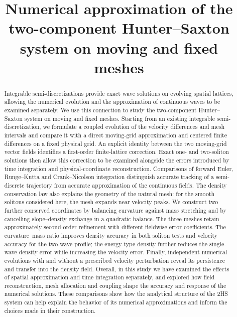 \documentclass{article}
\begin{document}
\title{\bfseries Numerical approximation of the two-component Hunter–Saxton system on moving and fixed meshes}
\author{}
\date{}
\maketitle
\begin{abstract}
Integrable semi-discretizations provide exact wave solutions on evolving spatial lattices, allowing the numerical evolution and the approximation of continuous waves to be examined separately. We use this connection to study the two-component Hunter–Saxton system on moving and fixed meshes. Starting from an existing integrable semi-discretization, we formulate a coupled evolution of the velocity differences and mesh intervals and compare it with a direct moving-grid approximation and centered finite differences on a fixed physical grid. An explicit identity between the two moving-grid vector fields identifies a first-order finite-lattice correction. Exact one- and two-soliton solutions then allow this correction to be examined alongside the errors introduced by time integration and physical-coordinate reconstruction. Comparisons of forward Euler, Runge–Kutta and Crank–Nicolson integration distinguish accurate tracking of a semi-discrete trajectory from accurate approximation of the continuous fields. The density conservation law also explains the geometry of the natural mesh: for the smooth solitons considered here, the mesh expands near velocity peaks. We construct two further conserved coordinates by balancing curvature against mass stretching and by cancelling slope--density exchange in a quadratic balance. The three meshes retain approximately second-order refinement with different fieldwise error coefficients. The curvature--mass ratio improves density accuracy in both soliton tests and velocity accuracy for the two-wave profile; the energy-type density further reduces the single-wave density error while increasing the velocity error. Finally, independent numerical evolutions with and without a prescribed velocity perturbation reveal its persistence and transfer into the density field. Overall, in this study we have examined the effects of spatial approximation and time integration separately, and explored how field reconstruction, mesh allocation and coupling shape the accuracy and response of the numerical solutions. These comparisons show how the analytical structure of the 2HS system can help explain the behavior of its numerical approximations and inform the choices made in their construction.
\end{abstract}
\end{document}
